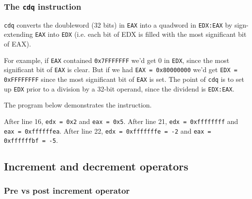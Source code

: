 \documentclass[a4paper]{article}
\begin{document}
\subsubsection{The \texttt{cdq} instruction}

\texttt{cdq} converts the doubleword (32 bits) in \texttt{EAX} into a quadword in \texttt{EDX:EAX} by sign-extending \texttt{EAX}  into \texttt{EDX} (i.e. each bit of EDX is filled with the most significant bit of EAX). 

For example, if \texttt{EAX}  contained \texttt{0x7FFFFFFF} we'd get 0 in \texttt{EDX}, since the most significant bit of \texttt{EAX} is clear. But if we had \texttt{EAX = 0x80000000} we'd get \texttt{EDX = 0xFFFFFFFF} since the most significant bit of \texttt{EAX} is set. The point of \texttt{cdq} is to set up \texttt{EDX} prior to a division by a 32-bit operand, since the dividend is \texttt{EDX:EAX}. 

The program below demonstrates the instruction.



After line 16, \texttt{edx = 0x2} and \texttt{eax = 0x5}. After line 21, \texttt{edx = 0xffffffff} and \texttt{eax = 0xffffffea}. After line 22, \texttt{edx = 0xfffffffe = -2} and \texttt{eax = 0xffffffbf = -5}.


\newpage
\subsection{Increment and decrement operators}
\label{app:pre_post_increment}

\subsubsection{Pre vs post increment operator}
\end{document}

